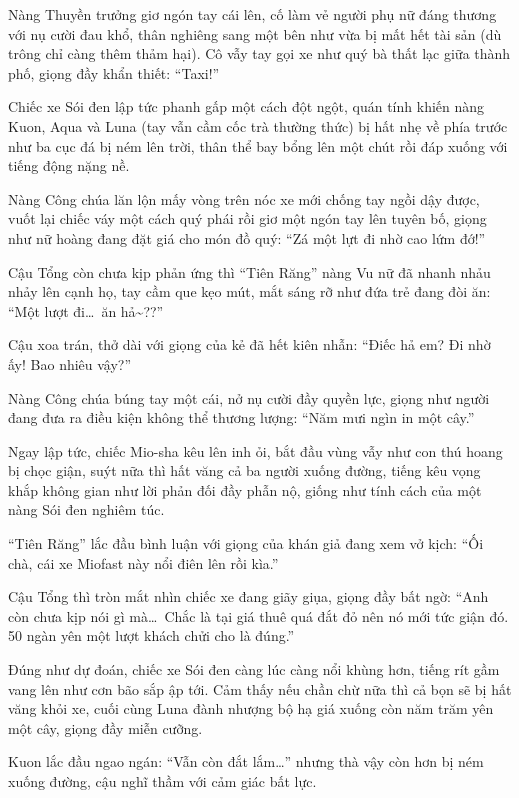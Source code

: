 \documentclass[../main.tex]{subfiles}
\begin{document}
Nàng Thuyền trưởng giơ ngón tay cái lên, cố làm vẻ người phụ nữ đáng thương với nụ cười đau khổ, thân nghiêng sang một bên như vừa bị mất hết tài sản (dù trông chỉ càng thêm thảm hại). Cô vẫy tay gọi xe như quý bà thất lạc giữa thành phố, giọng đầy khẩn thiết: ``Taxi!''

Chiếc xe Sói đen lập tức phanh gấp một cách đột ngột, quán tính khiến nàng Kuon, Aqua và Luna (tay vẫn cầm cốc trà thường thức) bị hất nhẹ về phía trước như ba cục đá bị ném lên trời, thân thể bay bổng lên một chút rồi đáp xuống với tiếng động nặng nề.

Nàng Công chúa lăn lộn mấy vòng trên nóc xe mới chống tay ngồi dậy được, vuốt lại chiếc váy một cách quý phái rồi giơ một ngón tay lên tuyên bố, giọng như nữ hoàng đang đặt giá cho món đồ quý: ``Zá một lựt đi nhờ cao lứm đớ!''

Cậu Tổng còn chưa kịp phản ứng thì ``Tiên Răng'' nàng Vu nữ đã nhanh nhảu nhảy lên cạnh họ, tay cầm que kẹo mút, mắt sáng rỡ như đứa trẻ đang đòi ăn: ``Một lượt đi\dots\ ăn hả\~{}??''

Cậu xoa trán, thở dài với giọng của kẻ đã hết kiên nhẫn: ``Điếc hả em? Đi nhờ ấy! Bao nhiêu vậy?''

Nàng Công chúa búng tay một cái, nở nụ cười đầy quyền lực, giọng như người đang đưa ra điều kiện không thể thương lượng: ``Năm mưi ngìn in một cây.''

Ngay lập tức, chiếc Mio-sha kêu lên inh ỏi, bắt đầu vùng vẫy như con thú hoang bị chọc giận, suýt nữa thì hất văng cả ba người xuống đường, tiếng kêu vọng khắp không gian như lời phản đối đầy phẫn nộ, giống như tính cách của một nàng Sói đen nghiêm túc.

``Tiên Răng'' lắc đầu bình luận với giọng của khán giả đang xem vở kịch: ``Ối chà, cái xe Miofast này nổi điên lên rồi kìa.''

Cậu Tổng thì tròn mắt nhìn chiếc xe đang giãy giụa, giọng đầy bất ngờ: ``Anh còn chưa kịp nói gì mà\dots\ Chắc là tại giá thuê quá đắt đỏ nên nó mới tức giận đó. 50 ngàn yên một lượt khách chửi cho là đúng.''

Đúng như dự đoán, chiếc xe Sói đen càng lúc càng nổi khùng hơn, tiếng rít gầm vang lên như cơn bão sắp ập tới. Cảm thấy nếu chần chừ nữa thì cả bọn sẽ bị hất văng khỏi xe, cuối cùng Luna đành nhượng bộ hạ giá xuống còn năm trăm yên một cây, giọng đầy miễn cưỡng.

Kuon lắc đầu ngao ngán: ``Vẫn còn đắt lắm\dots'' nhưng thà vậy còn hơn bị ném xuống đường, cậu nghĩ thầm với cảm giác bất lực.
\end{document}
